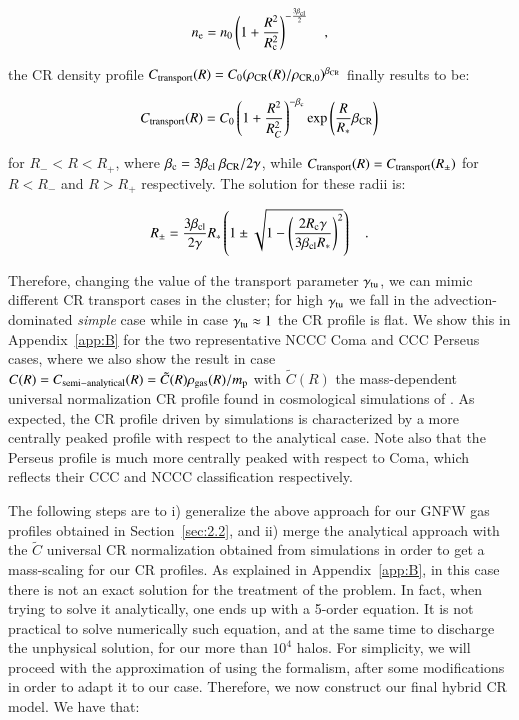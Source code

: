 \documentclass[traditabstract]{aa}
\newcommand{\rmn}{\mathrm}
\begin{document}
\begin{equation}
n_{\rm{e}} = n_{0} \left( 1+\frac{R^{2}}{R_{\rm{c}}^{2}} \right)^{-\frac{3\beta_{\rm{cl}}}{2}} \quad ,
\label{eq:beta_profile}
\end{equation} 

the CR density profile $C_{\rm{transport}}(R)=C_{0}(\rho_{\rm{CR}}(R)/\rho_{\rm{CR},0})^{\beta_{\rm{CR}}}$ finally results to be:

\begin{equation}
C_{\rm{transport}}(R) = C_{0}\left( 1+ \frac{R^{2}}{R_{C}^{2}} \right)^{-\beta_{\rm{c}}} \rmn{exp}\left( {\frac{R}{R_{*}}\beta_{\rm{CR}}} \right)
\label{eq:Ctransport}
\end{equation} 

for $R_{-}<R<R_{+}$, where $\beta_{\rm{c}}=3\beta_{\rm{cl}}~\beta_{\rm{CR}}/2\gamma$, while $C_{\rm{transport}}(R) = C_{\rm{transport}}(R_{\pm})$ for $R<R_{-}$ and $R>R_{+}$ respectively. The solution for these radii is:

\begin{equation}
R_{\pm} = \frac{3\beta_{\rm{cl}}}{2\gamma}R_{*}\left(1\pm\sqrt{1-\left(\frac{2R_{\rm{c}}\gamma}{3\beta_{\rm{cl}}R_{*}}\right)^{2}}\right) \quad .
\label{eq:Rpm}
\end{equation} 

Therefore, changing the value of the transport parameter $\gamma_{\rm{tu}}$, we can mimic different CR transport cases in the cluster; for high $\gamma_{\rm{tu}}$ we fall in the advection-dominated \emph{simple} case while in case $\gamma_{\rm{tu}}\approx1$ the CR profile is flat. We show this in Appendix~\ref{app:B} for the two representative NCCC Coma and CCC Perseus cases, where we also show the result in case $C(R)=C_{\rm{semi-analytical}}(R)=\tilde{C}(R)\rho_{\rm{gas}}(R)/m_{\rm{p}}$ with $\tilde{C}(R)$ the mass-dependent universal normalization CR profile found in cosmological simulations of \cite{2010MNRAS.409..449P}. As expected, the CR profile driven by simulations is characterized by a more centrally peaked profile with respect to the analytical case. Note also that the Perseus profile is much more centrally peaked with respect to Coma, which reflects their CCC and NCCC classification respectively.

The following steps are to i) generalize  the above approach for our GNFW gas profiles obtained in Section~\ref{sec:2.2}, and ii) merge the \cite{2011A&A...527A..99E} analytical approach with the $\tilde{C}$ universal CR normalization obtained from simulations in order to get a mass-scaling for our CR profiles. As explained in Appendix~\ref{app:B}, in this case there is not an exact solution for the \cite{2011A&A...527A..99E} treatment of the problem. In fact, when trying to solve it analytically, one ends up with a 5-order equation. It is not practical to solve numerically such equation, and at the same time to discharge the unphysical solution, for our more than $10^4$ halos. For simplicity, we will proceed with the approximation of using the \cite{2011A&A...527A..99E} formalism, after some modifications in order to adapt it to our case. Therefore, we now construct our final hybrid CR model. We have that:
\end{document}
